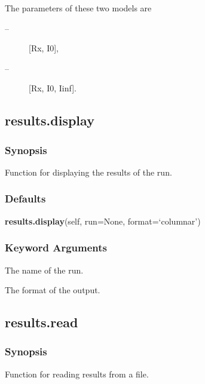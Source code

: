  The parameters of these two models are 
  

 \begin{description} 
 \item[ --] [Rx, I0],  
 \item[ --] [Rx, I0, Iinf].  
 \end{description} 
  

  

 \newpage 

 \subsection{results.display} 

  
 \subsubsection{Synopsis} 

 Function for displaying the results of the run. 
  

  
 \subsubsection{Defaults} 

 \textsf{\textbf{results.display}(self, run=None, format=`columnar')} 

  
 \subsubsection{Keyword Arguments} 

   The name of the run.   

   The format of the output.  

  

  

 \newpage 

 \subsection{results.read} 

  
 \subsubsection{Synopsis} 

 Function for reading results from a file. 
  


